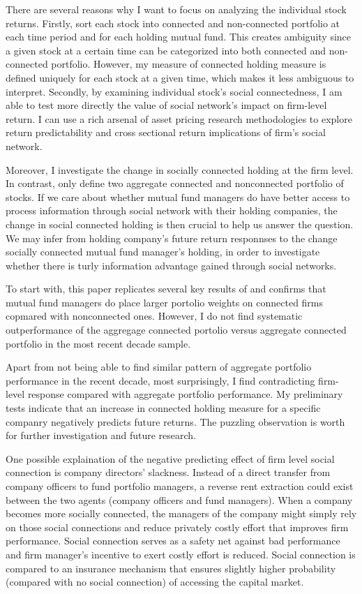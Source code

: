 \documentclass[11pt]{article}
\begin{document}
\begin{doublespace}
There are several reasons why I want to focus on analyzing the individual stock returns. Firstly, \cite{cohen2008small} sort each stock into connected and non-connected portfolio at each time period and for each holding mutual fund. This creates ambiguity since a given stock at a certain time can be categorized into both connected and non-connected portfolio. However, my measure of connected holding measure is defined uniquely for each stock at a given time, which makes it less ambiguous to interpret. Secondly, by examining individual stock's social connectedness, I am able to test more directly the value of social network's impact on firm-level return. I can use a rich arsenal of asset pricing research methodologies to explore return predictability and cross sectional return implications of firm's social network. 

Moreover, I investigate the change in socially connected holding at the firm level. In contrast, \cite{cohen2008small} only define two aggregate connected and nonconnected portfolio of stocks. If we care about whether mutual fund managers do have better access to process information through social network with their holding companies, the change in social connected holding is then crucial to help us answer the question. We may infer from holding company's future return responnses to the change socially connected mutual fund manager's holding, in order to investigate whether there is turly information advantage gained through social networks. 

To start with, this paper replicates several key results of \cite{cohen2008small} and confirms that mutual fund managers do place larger portolio weights on connected firms copmared with nonconnected ones. However, I do not find systematic outperformance of the aggregage connected portolio versus aggregate connected portfolio in the most recent decade sample. 

Apart from not being able to find similar pattern of aggregate portfolio performance in the recent decade, most surprisingly, I find contradicting firm-level response compared with \cite{cohen2008small} aggregate portfolio performance. My preliminary tests indicate that an increase in connected holding measure for a specific companry negatively predicts future returns. The puzzling observation is worth for further investigation and future research. 

One possible explaination of the negative predicting effect of firm level social connection is company directors' slackness. Instead of a direct transfer from company officers to fund portfolio managers, a reverse rent extraction could exist between the two agents (company officers and fund managers). When a company becomes more socially connected, the managers of the company might simply rely on those social connections and reduce privately costly effort that improves firm performance. Social connection serves as a safety net against bad performance and firm manager's incentive to exert costly effort is reduced. Social connection is compared to an insurance mechanism that ensures slightly higher probability (compared with no social connection) of accessing the capital market. 


\end{doublespace}
\end{document}
